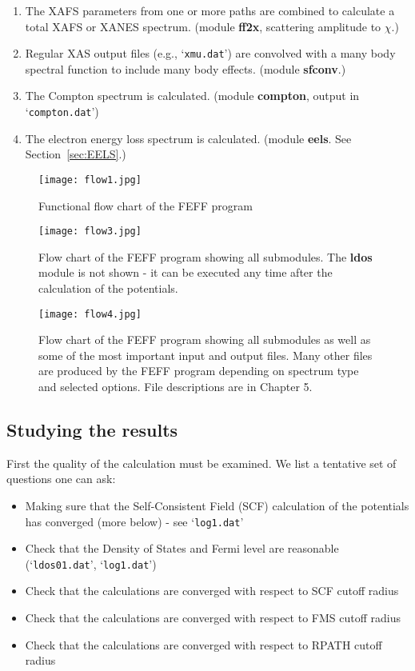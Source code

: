 \documentclass[11pt,oneside]{report} %
\newcommand{\file}[1]{`\texttt{#1}'}
\newcommand{\module}[1]{\textrm{\bf{#1}}}
\begin{document}
\begin{enumerate}
\item  The XAFS parameters from one or more paths are combined to
calculate a total XAFS or XANES spectrum.
(module \module{ff2x}, scattering amplitude to $\chi$.)

\item Regular XAS output files (e.g., \file{xmu.dat})
are convolved with a many body spectral function to include many body effects.
(module \module{sfconv}.)

\item The Compton spectrum is calculated. (module \module{compton}, output in \file{compton.dat})

\item The electron energy loss spectrum is calculated. (module  \module{eels}. See Section~\ref{sec:EELS}.)

\end{enumerate}


\begin{figure}[H]
	\centering
		\texttt{[image: flow1.jpg]}
		\caption{Functional flow chart of the FEFF program}   
	\label{fig:flow1}
\end{figure}

\begin{figure}[H]
	\centering
		\texttt{[image: flow3.jpg]}
		\caption{Flow chart of the FEFF program showing all submodules.  The \module{ldos} module is not shown - it can be executed any time after the calculation of the potentials.}   
	\label{fig:flow3}
\end{figure}

\begin{figure}[H]
	\centering
		\texttt{[image: flow4.jpg]}
		\caption{Flow chart of the FEFF program showing all submodules as well as some of the most important input and output files.  Many other files are produced by the FEFF program depending on spectrum type and selected options.  File descriptions are in Chapter 5.}   
	\label{fig:flow4}
\end{figure}


\subsection{Studying the results}

First the quality of the calculation must be examined.  We list a tentative set of questions one can ask:
\begin{itemize} \tightlist
\item Making sure that the Self-Consistent Field (SCF) calculation of the potentials has converged (more below) - see \file{log1.dat}
\item Check that the Density of States and Fermi level are reasonable (\file{ldos01.dat}, \file{log1.dat})
\item Check that the calculations are converged with respect to SCF cutoff radius
\item Check that the calculations are converged with respect to FMS cutoff radius
\item Check that the calculations are converged with respect to RPATH cutoff radius
\end{itemize}
\end{document}
